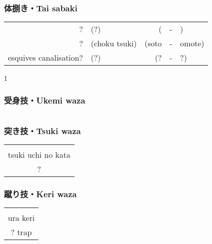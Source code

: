 \subsubsection{体捌き・Tai sabaki}
\begin{table}[H]
\begin{center}
\begin{tabular}{rlrcl}
    ? & (?) & (\ruby{}{} & - & \ruby{}{})\\
    ? & (choku tsuki) & (soto & - & omote)\\
    esquives canalisation? & (?) & (? & - & ?)
\end{tabular}
\end{center}
\label{kyuu_2_taisabaki}
\end{table}
\begin{center}
    1 
\end{center}

\subsubsection{受身技・Ukemi waza}
\begin{table}[H]
\begin{center}
\begin{tabular}{c}
\end{tabular}
\end{center}
\label{kyuu_2_ukemi_waza}
\end{table}

\subsubsection{突き技・Tsuki waza}
\begin{table}[H]
\begin{center}
\begin{tabular}{c}
    \ruby{}{}\\
    tsuki uchi no kata\\
    ?
\end{tabular}
\end{center}
\label{kyuu_2_tsuki_waza}
\end{table}

\subsubsection{蹴り技・Keri waza}
\begin{table}[H]
\begin{center}
\begin{tabular}{c}
    \ruby{}{}\\
    ura keri\\
    ? trap
\end{tabular}
\end{center}
\label{kyuu_2_keri_waza}
\end{table}


